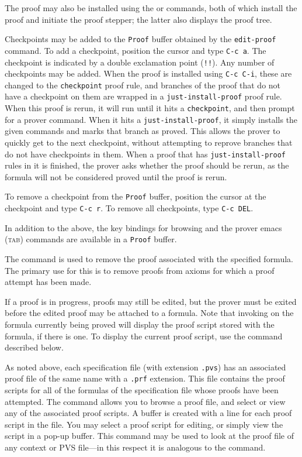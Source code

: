 The proof may also be installed using the  or
 commands, both of which install the proof
and initiate the proof stepper; the latter also displays the proof tree.

Checkpoints may be added to the \texttt{Proof} buffer obtained by the
\texttt{edit-proof} command.  To add a checkpoint, position the cursor and
type \texttt{C-c a}.  The checkpoint is indicated by a double exclamation
point (\texttt{!!}).  Any number of checkpoints may be added.  When the
proof is installed using \texttt{C-c C-i}, these are changed to the
\texttt{checkpoint} proof rule, and branches of the proof that do not have
a checkpoint on them are wrapped in a \texttt{just-install-proof} proof
rule.  When this proof is rerun, it will run until it hits a
\texttt{checkpoint}, and then prompt for a prover command.  When it hits a
\texttt{just-install-proof}, it simply installs the given commands and
marks that branch as proved.  This allows the prover to quickly get to the
next checkpoint, without attempting to reprove branches that do not have
checkpoints in them.  When a proof that has \texttt{just-install-proof}
rules in it is finished, the prover asks whether the proof should be
rerun, as the formula will not be considered proved until the proof is
rerun.

To remove a checkpoint from the \texttt{Proof} buffer, position the cursor
at the checkpoint and type \texttt{C-c r}.  To remove all checkpoints,
type \texttt{C-c DEL}.

In addition to the above, the key bindings for browsing and the prover
emacs (\textsc{tab}) commands are available in a \texttt{Proof} buffer.

The  command is used to remove the proof associated with
the specified formula.  The primary use for this is to remove proofs from
axioms for which a proof attempt has been made.

If a proof is in progress, proofs may still be edited, but the prover must
be exited before the edited proof may be attached to a formula.  Note that
invoking  on the formula currently being proved will
display the proof script stored with the formula, if there is one.  To
display the current proof script, use the 
command described below.

As noted above, each specification file (with extension \texttt{.pvs}) has
an associated proof file of the same name with a \texttt{.prf} extension.
This file contains the proof scripts for all of the formulas of the
specification file whose proofs have been attempted.  The
 command allows you to browse a proof file, and
select or view any of the associated proof scripts.  A 
buffer is created with a line for each proof script in the file.  You may
select a proof script for editing, or simply view the script in a pop-up
buffer.  This command may be used to look at the proof file of any context
or PVS file---in this respect it is analogous to the 
command.

